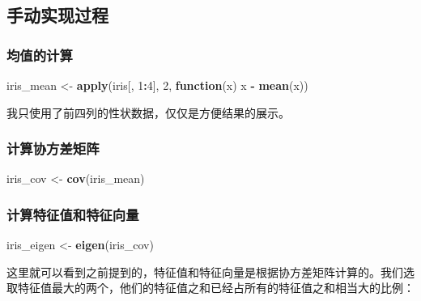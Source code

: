 \documentclass[
]{krantz}
\makeatletter
\newenvironment{Shaded}{\begin{snugshade}}{\end{snugshade}}
\newcommand{\ControlFlowTok}[1]{\textcolor[rgb]{0.13,0.29,0.53}{\textbf{#1}}}
\newcommand{\DecValTok}[1]{\textcolor[rgb]{0.00,0.00,0.81}{#1}}
\newcommand{\KeywordTok}[1]{\textcolor[rgb]{0.13,0.29,0.53}{\textbf{#1}}}
\newcommand{\NormalTok}[1]{#1}
\newcommand{\OperatorTok}[1]{\textcolor[rgb]{0.81,0.36,0.00}{\textbf{#1}}}
\newcommand{\StringTok}[1]{\textcolor[rgb]{0.31,0.60,0.02}{#1}}
\newenvironment{kframe}{%
\medskip{}
\setlength{\fboxsep}{.8em}
 \def\at@end@of@kframe{}%
 \ifinner\ifhmode%
  \def\at@end@of@kframe{\end{minipage}}%
  \begin{minipage}{\columnwidth}%
 \fi\fi%
 \def\FrameCommand##1{\hskip\@totalleftmargin \hskip-\fboxsep
 \colorbox{shadecolor}{##1}\hskip-\fboxsep
     \hskip-\linewidth \hskip-\@totalleftmargin \hskip\columnwidth}%
 \MakeFramed {\advance\hsize-\width
   \@totalleftmargin\z@ \linewidth\hsize
   \@setminipage}}%
 {\par\unskip\endMakeFramed%
 \at@end@of@kframe}
\renewenvironment{Shaded}{\begin{kframe}}{\end{kframe}}
\makeatother
\begin{document}
\hypertarget{man_pca}{%
\subsection{手动实现过程}\label{man_pca}}

\hypertarget{av_val}{%
\subsubsection{均值的计算}\label{av_val}}

\begin{Shaded}
\begin{Highlighting}[]
\NormalTok{iris\_mean \textless{}{-}}\StringTok{ }\KeywordTok{apply}\NormalTok{(iris[, }\DecValTok{1}\OperatorTok{:}\DecValTok{4}\NormalTok{], }\DecValTok{2}\NormalTok{, }\ControlFlowTok{function}\NormalTok{(x) x }\OperatorTok{{-}}\StringTok{ }\KeywordTok{mean}\NormalTok{(x))}
\end{Highlighting}
\end{Shaded}

我只使用了前四列的性状数据，仅仅是方便结果的展示。

\hypertarget{cov_val}{%
\subsubsection{计算协方差矩阵}\label{cov_val}}

\begin{Shaded}
\begin{Highlighting}[]
\NormalTok{iris\_cov \textless{}{-}}\StringTok{ }\KeywordTok{cov}\NormalTok{(iris\_mean)}
\end{Highlighting}
\end{Shaded}

\hypertarget{eig_val}{%
\subsubsection{计算特征值和特征向量}\label{eig_val}}

\begin{Shaded}
\begin{Highlighting}[]
\NormalTok{iris\_eigen \textless{}{-}}\StringTok{ }\KeywordTok{eigen}\NormalTok{(iris\_cov)}
\end{Highlighting}
\end{Shaded}

这里就可以看到之前提到的，特征值和特征向量是根据协方差矩阵计算的。我们选取特征值最大的两个，他们的特征值之和已经占所有的特征值之和相当大的比例：
\end{document}
